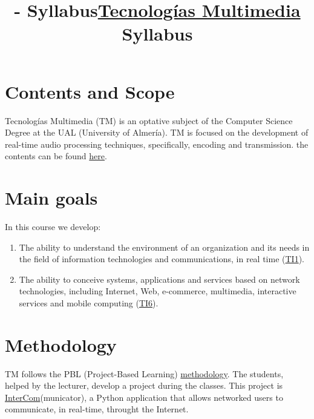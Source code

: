 

\title{\TM{} - Syllabus}
\title{\href{https://tecnologias-multimedia.github.io/}{Tecnologías Multimedia} \newline Syllabus}

\maketitle

\section{Contents and Scope}

Tecnologías Multimedia (TM) is an optative subject of the Computer
Science Degree at the UAL (University of Almería). TM is focused on
the development of real-time audio processing techniques,
specifically, encoding and transmission. the contents can be found
\href{https://tecnologias-multimedia.github.io/contents/}{here}.

\section{Main goals}

In this course we develop:
\begin{enumerate}
\item The ability to understand the environment of an organization and
  its needs in the field of information technologies and
  communications, in real time
  (\href{https://www.ual.es/application/files/8516/5061/5446/memoriavig-ing-informatica-4015.pdf}{TI1}).
\item The ability to conceive systems, applications and services based
  on network technologies, including Internet, Web, e-commerce,
  multimedia, interactive services and mobile computing
  (\href{https://www.ual.es/application/files/8516/5061/5446/memoriavig-ing-informatica-4015.pdf}{TI6}).
\end{enumerate}

\section{Methodology}

TM follows the PBL (Project-Based Learning)
\href{http://portafirma.ual.es/pfirma/downloadReport/file?idDocument=4u61Ie5es2&idRequest=ZeBY35LlFa}{methodology}. The
students, helped by the lecturer, develop a project during the
classes. This project is
\href{https://github.com/Tecnologias-multimedia/intercom}{InterCom}(municator),
a Python application that allows networked users to communicate, in
real-time, throught the Internet.

